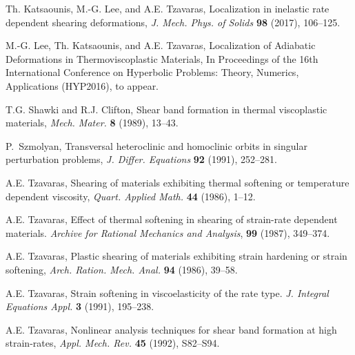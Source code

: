 \documentclass[a4paper,11pt]{article}
\theoremstyle{remark}
\begin{document}
\begin{thebibliography}{10}
{\sc Th. Katsaounis, M.-G. Lee, and A.E. Tzavaras},
Localization in inelastic rate dependent shearing deformations,
{\it J. Mech. Phys. of Solids} {\bf 98} (2017), 106--125.

{\sc M.-G. Lee, Th. Katsaounis, and A.E. Tzavaras},
Localization of Adiabatic Deformations in Thermoviscoplastic Materials, In Proceedings of the 16th International Conference on Hyperbolic Problems: Theory, Numerics, Applications (HYP2016), to appear.

%
%
%

%
%

{\sc T.G. Shawki and R.J. Clifton},
Shear band formation in thermal viscoplastic materials,
{\it Mech. Mater.}
{\bf 8 } (1989), 13--43.

{\sc P.~Szmolyan},
Transversal heteroclinic and homoclinic orbits in singular perturbation problems,
{\it J. Differ. Equations}
{\bf 92} (1991), 252--281.

{\sc A.E. Tzavaras},
Shearing of materials exhibiting thermal softening or temperature dependent viscosity,
{\em Quart.  Applied Math.} {\bf 44} (1986), 1--12.

{\sc A.E. Tzavaras},
Effect of thermal softening in shearing of strain-rate dependent materials.
{\em Archive for Rational Mechanics and Analysis}, {\bf 99} (1987), 349--374.

{\sc A.E. Tzavaras},
Plastic shearing of materials exhibiting strain hardening or strain softening,
{\it Arch. Ration. Mech. Anal.}
{\bf 94} (1986), 39--58.

{\sc A.E. Tzavaras},
Strain softening in viscoelasticity of the rate type.
{\it J. Integral Equations Appl.} {\bf  3}  (1991), 195--238.

{\sc A.E. Tzavaras},
Nonlinear analysis techniques for shear band formation at high strain-rates,
{\it Appl. Mech. Rev.}
{\bf  45} (1992), S82--S94.




\end{thebibliography}
\end{document}
